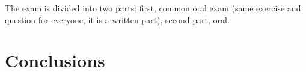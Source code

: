 \documentclass[11pt, a4paper, twoside, openright]{book}
\begin{document}
The exam is divided into two parts: first, common oral exam (same exercise and question for everyone, it is a written part), second part, oral.

\mainmatter
\pagestyle{fancy}







\backmatter
\pagestyle{plain}

\chapter{Conclusions}


\end{document}
